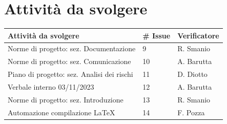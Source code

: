 \documentclass{article}
\begin{document}
\section{Attività da svolgere}
\begin{center}
    \begin{tabular}{|C{7cm}|C{1,5cm}|C{3cm}|}
        \hline
        \textbf{Attività da svolgere} & \textbf{\# Issue} & \textbf{Verificatore} \\
        \hline
        \hline
        Norme di progetto: sez. Documentazione & 9 & R. Smanio \\
        Norme di progetto: sez. Comunicazione & 10 & A. Barutta \\
        Piano di progetto: sez. Analisi dei rischi & 11 & D. Diotto \\
        Verbale interno 03/11/2023 & 12 & A. Barutta \\
        Norme di progetto: sez. Introduzione & 13 & R. Smanio \\
        Automazione compilazione \LaTeX & 14 & F. Pozza \\
        \hline
    \end{tabular}
\end{center}
    
\end{document}
